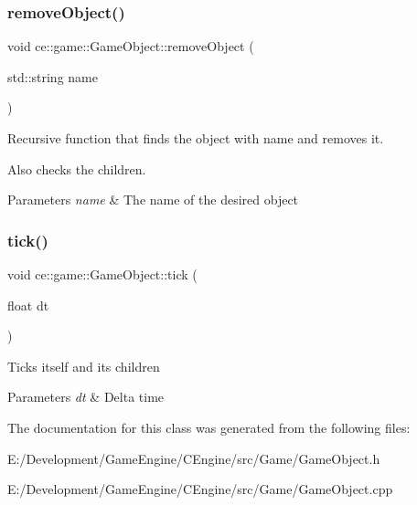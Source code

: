 \subsubsection{\texorpdfstring{remove\+Object()}{removeObject()}}
{\footnotesize\ttfamily void ce\+::game\+::\+Game\+Object\+::remove\+Object (\begin{DoxyParamCaption}\item[{std\+::string}]{name }\end{DoxyParamCaption})}



Recursive function that finds the object with name and removes it. 

Also checks the children.


\begin{DoxyParams}{Parameters}
{\em name} & The name of the desired object \\
\hline
\end{DoxyParams}
\mbox{\label{classce_1_1game_1_1_game_object_aa77b42484f1a5c0abf1d4bf1564becac}} 
\subsubsection{\texorpdfstring{tick()}{tick()}}
{\footnotesize\ttfamily void ce\+::game\+::\+Game\+Object\+::tick (\begin{DoxyParamCaption}\item[{float}]{dt }\end{DoxyParamCaption})}

Ticks itself and its children


\begin{DoxyParams}{Parameters}
{\em dt} & Delta time \\
\hline
\end{DoxyParams}


The documentation for this class was generated from the following files\+:\begin{DoxyCompactItemize}
\item 
E\+:/\+Development/\+Game\+Engine/\+C\+Engine/src/\+Game/Game\+Object.\+h\item 
E\+:/\+Development/\+Game\+Engine/\+C\+Engine/src/\+Game/Game\+Object.\+cpp\end{DoxyCompactItemize}
